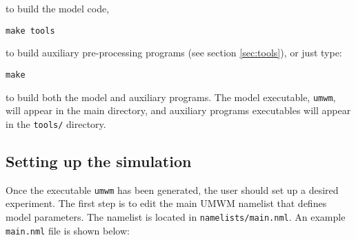 \documentclass[letterpaper]{article}
\numberwithin{equation}{section}
\begin{document}
to build the model code,

\begin{verbatim}
make tools
\end{verbatim}

to build auxiliary pre-processing programs (see section \ref{sec:tools}), or just type:

\begin{verbatim}
make
\end{verbatim}

to build both the model and auxiliary programs.
The model executable, \verb+umwm+, will appear in the main directory,
and auxiliary programs executables will appear in the \verb+tools/+ directory.

\subsection{Setting up the simulation}

Once the executable \verb+umwm+ has been generated, 
the user should set up a desired experiment. 
The first step is to edit the main UMWM namelist that defines model parameters.
The namelist is located in \verb+namelists/main.nml+.
An example \verb+main.nml+ file is shown below:
\end{document}
